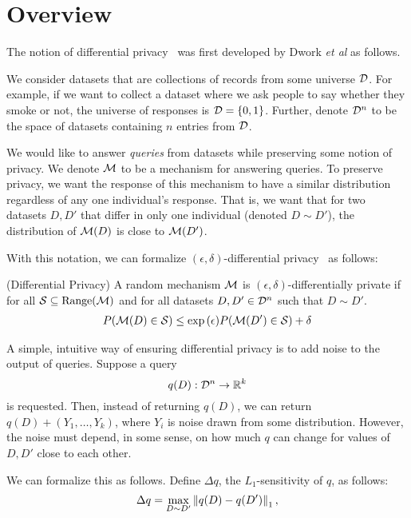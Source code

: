 \documentclass{article} %
\begin{document}
\section{Overview}\label{overview}
The notion of differential privacy~\cite{dwork2006calibrating} was first
developed by Dwork \emph{et al} as follows.


We consider datasets that are collections of records from some universe $\mathcal{D}$.
For example, if we want to collect a dataset where we ask people to say whether
they smoke or not, the universe of responses is $\mathcal{D} = \{0, 1\}$. Further,
denote $\mathcal{D}^n$ to be the space of datasets containing $n$ entries from $\mathcal{D}$.

We would like to answer \textit{queries} from datasets while preserving some
notion of privacy. We denote $\mathcal{M}$ to be a mechanism for answering
queries. To preserve privacy, we want the response of this mechanism
to have a similar distribution regardless of any one individual's response.
That is, we want that for two datasets $D, D'$ that differ in only one
individual (denoted $D \sim D'$), the distribution of $\mathcal{M}(D)$ is close to
$\mathcal{M}(D')$.

With this notation, we can formalize $(\epsilon, \delta)$-differential
privacy~\cite{dwork2014algorithmic} as follows:

\begin{definition}{(Differential Privacy)}
A random mechanism $\mathcal{M}$ is $(\epsilon, \delta)$-differentially private
if for all $\mathcal{S} \subseteq \textup{Range}(\mathcal{M})$ and for all
datasets $D, D' \in \mathcal{D}^n$ such that $D \sim D'$.
\begin{align*}
P(\mathcal{M}(D) \in \mathcal{S}) \leq \exp{(\epsilon)} P(\mathcal{M}(D') \in \mathcal{S}) + \delta
\end{align*}
\end{definition}

A simple, intuitive way of ensuring differential privacy is to add noise to the
output of queries. Suppose a query
\[ q(D) : \mathcal{D}^n \rightarrow \mathbb{R}^k \]
is requested. Then, instead of returning $q(D)$, we can return
$q(D) + (Y_1, \dots, Y_k)$, where $Y_i$ is noise drawn from some distribution.
However, the noise must depend, in some sense, on how much $q$ can change for
values of $D, D'$ close to each other.

We can formalize this as follows. Define $\Delta q$, the $L_1$-sensitivity of
$q$, as follows:
\begin{align*}
\Delta q = \max_{D \sim D'} \left\lVert q(D) - q(D')\right\rVert_1,
\end{align*}
\end{document}
